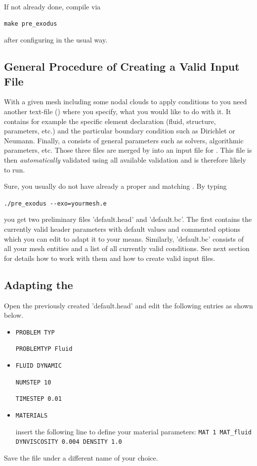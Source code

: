 If not already done, compile \prexo via \begin{verbatim}make pre_exodus\end{verbatim} after 
configuring \baci{} in the usual way.

\subsection{General Procedure of Creating a Valid \baci{} Input File}
With a given mesh including some nodal clouds to apply conditions to you need
another text-file {(\bc)} where you specify, what you would like to do with
it. It contains for example the specific element declaration (fluid, structure,
parameters, etc.) and the particular boundary condition such as Dirichlet or
Neumann. Finally, a \head consists of general parameters such as
solvers, algorithmic parameters, etc. Those three files are merged by \prexo
into an input file for \baci{}. This file is then \emph{automatically} validated
using all available \baci{} validation and is therefore likely to run.

Sure, you usually do not have already a proper \head and matching \bc. By
typing
\begin{center}
  \verb|./pre_exodus --exo=yourmesh.e|
\end{center}
you get two preliminary files
'default.head' and 'default.bc'. The first contains the currently valid header
parameters with default values and commented options which you can edit to
adapt it to your means. Similarly, 'default.bc' consists of all your mesh
entities and a list of all currently valid conditions. See next section for
details how to work with them and how to create valid input files.


\subsection{Adapting the \head}
Open the previously created \head 'default.head' and edit the following entries as shown below.
\begin{itemize}
 \item \verb|PROBLEM TYP|

 \verb|PROBLEMTYP Fluid|
 \item \verb|FLUID DYNAMIC|

 \verb|NUMSTEP 10|

 \verb|TIMESTEP 0.01|

 \item \verb|MATERIALS|

 insert the following line to define your material parameters: \newline
 \verb|MAT 1 MAT_fluid DYNVISCOSITY 0.004 DENSITY 1.0|
 
\end{itemize}
Save the file under a different name of your choice.


